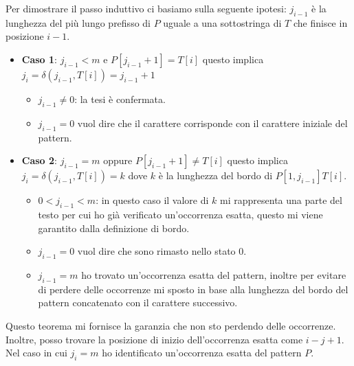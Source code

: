 \begin{dimostrazione}
\begin{enumerate}
              Per dimostrare il passo induttivo ci basiamo sulla seguente ipotesi:
              $j_{i - 1}$ è la lunghezza del più lungo prefisso di $P$ uguale a
              una sottostringa di $T$ che finisce in posizione $i - 1$.
              \begin{itemize}
                  \item \textbf{Caso 1}: $j_{i - 1} < m$ e $P[j_{i - 1} + 1] =
                            T[i]$ questo implica $j_i = \delta(j_{i - 1}, T[i])
                            = j_{i - 1} + 1$
                        \begin{itemize}
                            \item $j_{i - 1} \neq 0$: la tesi è confermata.
                            \item $j_{i - 1} = 0$ vuol dire che il carattere
                                  corrisponde con il carattere iniziale del pattern.
                        \end{itemize}
                  \item \textbf{Caso 2}: $j_{i - 1} = m$ oppure $P[j_{i - 1} + 1]
                            \neq T[i]$ questo implica $j_i = \delta(j_{i - 1},
                            T[i]) = k$ dove $k$ è la lunghezza del bordo di
                        $P[1, j_{i - 1}]T[i]$.
                        \begin{itemize}
                            \item $0 < j_{i - 1} < m$: in questo caso il valore
                                  di $k$ mi rappresenta una parte del testo per
                                  cui ho già verificato un'occorrenza esatta,
                                  questo mi viene garantito dalla definizione di
                                  bordo.
                            \item $j_{i - 1} = 0$ vuol dire che sono rimasto
                                  nello stato 0.
                            \item $j_{i - 1} = m$ ho trovato un'occorrenza esatta
                                  del pattern, inoltre per evitare di perdere delle
                                  occorrenze mi sposto in base alla lunghezza del
                                  bordo del pattern concatenato con il carattere
                                  successivo.
                        \end{itemize}
              \end{itemize}
    \end{enumerate}
\end{dimostrazione}
Questo teorema mi fornisce la garanzia che non sto perdendo delle occorrenze.
Inoltre, posso trovare la posizione di inizio dell'occorrenza esatta come $i - j
    + 1$. Nel caso in cui $j_i = m$ ho identificato un'occorrenza esatta del
pattern $P$.

